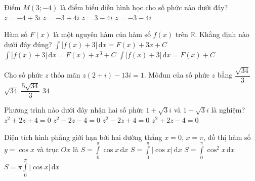 \begin{ex}%
	Điểm $M(3;-4)$ là điểm biểu diễn hình học cho số phức nào dưới đây?
	\choice
	{$z=-4+3i$}
	{$z=-3+4i$}
	{\True $z=3-4i$}
	{$z=-3-4i$}
\end{ex}

\begin{ex}%
	Hàm số $F(x)$ là một nguyên hàm của hàm số $f(x)$ trên $\mathbb{R}$. Khẳng định nào dưới đây đúng?
	{\True $\displaystyle\int\big[f(x)+3\big]\mathrm{\,d}x=F(x)+3x+C$}
	{$\displaystyle\int\big[f(x)+3\big]\mathrm{\,d}x=F(x)+x^3+C$}
	{$\displaystyle\int\big[f(x)+3\big]\mathrm{\,d}x=F(x)+C$}
\end{ex}

\begin{ex}%
	Cho số phức $z$ thỏa mãn $z(2+i)-13i=1$. Môđun của số phức $z$ bằng
	\choice
	{$\dfrac{\sqrt{34}}{3}$}
	{\True $\sqrt{34}$}
	{$\dfrac{5 \sqrt{34}}{3}$}
	{$34$}
\end{ex}

\begin{ex}%
	Phương trình nào dưới đây nhận hai số phức $1+\sqrt{3}i$ và $1-\sqrt{3}i$ là nghiệm?
	\choice
	{$z^2+2z+4=0$}
	{$z^2-2z-4=0$}
	{\True $z^2-2z+4=0$}
	{$z^2+2z-4=0$}
\end{ex}

\begin{ex}%
	Diện tích hình phẳng giới hạn bởi hai đường thẳng $x=0$, $x=\pi$, đồ thị hàm số $y=\cos x$ và trục $Ox$ là
	\choice
	{$S=\displaystyle\int\limits_0^\pi\cos x\mathrm{\,d}x$}
	{\True $S=\displaystyle\int\limits_0^\pi|\cos x| \mathrm{\,d}x$}
	{$S=\displaystyle\int\limits_0^\pi \cos ^2 x \mathrm{\,d}x$}
	{$S=\pi \displaystyle\int\limits_0^\pi|\cos x| \mathrm{\,d}x$}
\end{ex}

